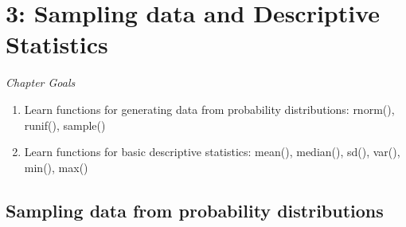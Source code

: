 \documentclass{tufte-book}\usepackage[]{graphicx}\usepackage[]{color}
\begin{document}
\chapter{3: Sampling data and Descriptive Statistics}
\label{ch:3}

\textit{Chapter Goals}

\begin{enumerate}
  \item Learn functions for generating data from probability distributions: rnorm(), runif(), sample()
  \item Learn functions for basic descriptive statistics: mean(), median(), sd(), var(), min(), max()
\end{enumerate}


\section{Sampling data from probability distributions}
\end{document}

